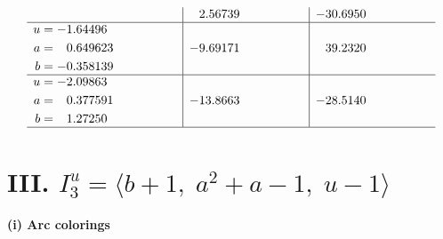 \documentclass[1p]{elsarticle_modified}
\theoremstyle{definition}
\begin{document}
$$\begin{array}{c|c|c}
 & \phantom{-}2.56739\phantom{ +0.000000I} & -30.6950\phantom{ +0.000000I} \\ \hline\begin{aligned}
u &= -1.64496\phantom{ +0.000000I} \\
a &= \phantom{-}0.649623\phantom{ +0.000000I} \\
b &= -0.358139\phantom{ +0.000000I}\end{aligned}
 & -9.69171\phantom{ +0.000000I} & \phantom{-}39.2320\phantom{ +0.000000I} \\ \hline\begin{aligned}
u &= -2.09863\phantom{ +0.000000I} \\
a &= \phantom{-}0.377591\phantom{ +0.000000I} \\
b &= \phantom{-}1.27250\phantom{ +0.000000I}\end{aligned}
 & -13.8663\phantom{ +0.000000I} & -28.5140\phantom{ +0.000000I}\\
 \hline 
 \end{array}$$\newpage\newpage\renewcommand{\arraystretch}{1}
\centering \section*{III. $I^u_{3}= \langle b+1,\;a^2+a-1,\;u-1 \rangle$}
\flushleft \textbf{(i) Arc colorings}\\
\end{document}
